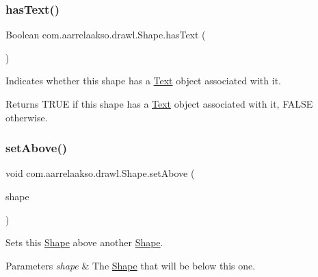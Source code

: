 \subsubsection{\texorpdfstring{has\+Text()}{hasText()}}
{\footnotesize\ttfamily Boolean com.\+aarrelaakso.\+drawl.\+Shape.\+has\+Text (\begin{DoxyParamCaption}{ }\end{DoxyParamCaption})\hspace{0.3cm}{\ttfamily [inherited]}}



Indicates whether this shape has a \hyperlink{classcom_1_1aarrelaakso_1_1drawl_1_1_text}{Text} object associated with it. 

\begin{DoxyReturn}{Returns}
T\+R\+UE if this shape has a \hyperlink{classcom_1_1aarrelaakso_1_1drawl_1_1_text}{Text} object associated with it, F\+A\+L\+SE otherwise. 
\end{DoxyReturn}
\mbox{\label{classcom_1_1aarrelaakso_1_1drawl_1_1_shape_a47d2d3ec9719ad5ccc1d1dfb791358d4}} 
\subsubsection{\texorpdfstring{set\+Above()}{setAbove()}\hspace{0.1cm}{\footnotesize\ttfamily [1/2]}}
{\footnotesize\ttfamily void com.\+aarrelaakso.\+drawl.\+Shape.\+set\+Above (\begin{DoxyParamCaption}\item[{@Not\+Null \hyperlink{classcom_1_1aarrelaakso_1_1drawl_1_1_shape}{Shape}}]{shape }\end{DoxyParamCaption})\hspace{0.3cm}{\ttfamily [inherited]}}



Sets this \hyperlink{classcom_1_1aarrelaakso_1_1drawl_1_1_shape}{Shape} above another \hyperlink{classcom_1_1aarrelaakso_1_1drawl_1_1_shape}{Shape}. 


\begin{DoxyParams}{Parameters}
{\em shape} & The \hyperlink{classcom_1_1aarrelaakso_1_1drawl_1_1_shape}{Shape} that will be below this one. \\
\hline
\end{DoxyParams}
\mbox{\label{classcom_1_1aarrelaakso_1_1drawl_1_1_shape_a3d3e7adc0ba7f4634c913773d326f4e6}} 
